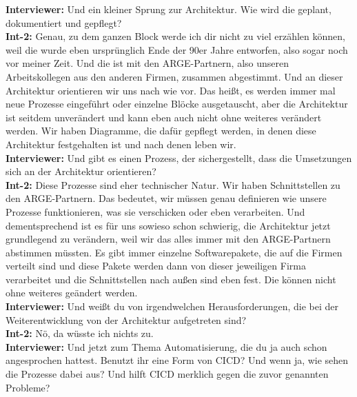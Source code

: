 \textbf{Interviewer:} Und ein kleiner Sprung zur Architektur. Wie wird die geplant, dokumentiert und gepflegt?\\
\textbf{Int-2:} Genau, zu dem ganzen Block werde ich dir nicht zu viel erzählen können, weil die wurde eben ursprünglich Ende der 90er Jahre entworfen, also sogar noch vor meiner Zeit. Und die ist mit den ARGE-Partnern, also unseren Arbeitskollegen aus den anderen Firmen, zusammen abgestimmt. Und an dieser Architektur orientieren wir uns nach wie vor. Das heißt, es werden immer mal neue Prozesse eingeführt oder einzelne Blöcke ausgetauscht, aber die Architektur ist seitdem unverändert und kann eben auch nicht ohne weiteres verändert werden. Wir haben Diagramme, die dafür gepflegt werden, in denen diese Architektur festgehalten ist und nach denen leben wir. \\
\textbf{Interviewer:} Und gibt es einen Prozess, der sichergestellt, dass die Umsetzungen sich an der Architektur orientieren?\\
\textbf{Int-2:} Diese Prozesse sind eher technischer Natur. Wir haben Schnittstellen zu den ARGE-Partnern. Das bedeutet, wir müssen genau definieren wie unsere Prozesse funktionieren, was sie verschicken oder eben verarbeiten. Und dementsprechend ist es für uns sowieso schon schwierig, die Architektur jetzt grundlegend zu verändern, weil wir das alles immer mit den ARGE-Partnern abstimmen müssten. Es gibt immer einzelne Softwarepakete, die auf die Firmen verteilt sind und diese Pakete werden dann von dieser jeweiligen Firma verarbeitet und die Schnittstellen nach außen sind eben fest. Die können nicht ohne weiteres geändert werden. \\
\textbf{Interviewer:} Und weißt du von irgendwelchen Herausforderungen, die bei der Weiterentwicklung von der Architektur aufgetreten sind? \\
\textbf{Int-2:} Nö, da wüsste ich nichts zu. \\
\textbf{Interviewer:} Und jetzt zum Thema Automatisierung, die du ja auch schon angesprochen hattest. Benutzt ihr eine Form von CICD? Und wenn ja, wie sehen die Prozesse dabei aus? Und hilft CICD merklich gegen die zuvor genannten Probleme? \\
